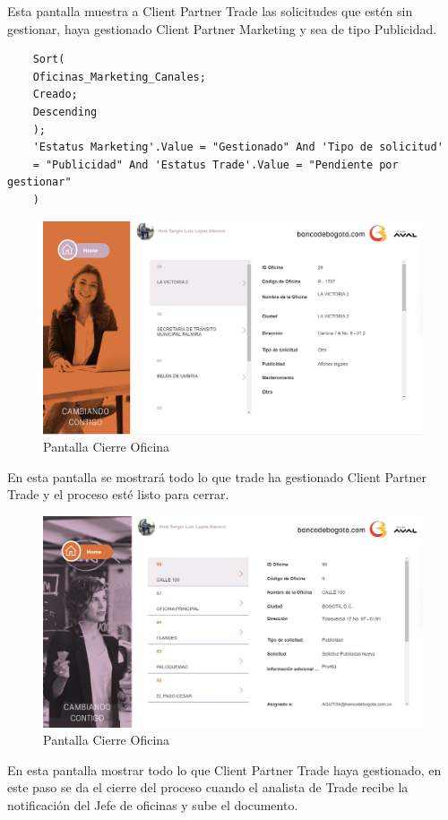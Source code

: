 Esta pantalla muestra a Client Partner Trade las solicitudes que estén sin gestionar, haya gestionado Client Partner Marketing y sea de tipo Publicidad.

\begin{verbatim}
	Sort(
	Oficinas_Marketing_Canales;
	Creado;
	Descending
	);
	'Estatus Marketing'.Value = "Gestionado" And 'Tipo de solicitud'
	= "Publicidad" And 'Estatus Trade'.Value = "Pendiente por gestionar"
	)
\end{verbatim}

\begin{figure}[H]
	\centering
	\includegraphics[scale=0.25]{Capitulo4/imagenes/23.png}
	\caption{Pantalla Cierre Oficina}
	\label{CTrea}
\end{figure}
En esta pantalla se mostrará todo lo que trade ha gestionado Client Partner Trade y el proceso esté listo para cerrar.


\begin{figure}[H]
	\centering
	\includegraphics[scale=0.25]{Capitulo4/imagenes/24.png}
	\caption{Pantalla Cierre Oficina}
	\label{CTrea2}
\end{figure}

En esta pantalla mostrar todo lo que Client Partner Trade haya gestionado, en este paso se da el cierre del proceso cuando el analista de Trade recibe la notificación del Jefe de oficinas y sube el documento.